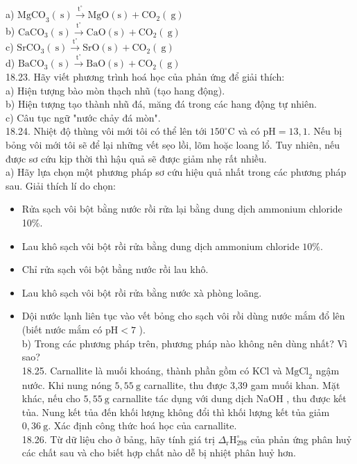 \documentclass[10pt]{article}
\begin{document}
a) $\mathrm{MgCO}_{3}(\mathrm{~s}) \xrightarrow{\mathrm{t}^{\circ}} \mathrm{MgO}(\mathrm{s})+\mathrm{CO}_{2}(\mathrm{~g})$\\
b) $\mathrm{CaCO}_{3}(\mathrm{~s}) \xrightarrow{\mathrm{t}^{\circ}} \mathrm{CaO}(\mathrm{s})+\mathrm{CO}_{2}(\mathrm{~g})$\\
c) $\mathrm{SrCO}_{3}(\mathrm{~s}) \xrightarrow{\mathrm{t}^{\circ}} \mathrm{SrO}(\mathrm{s})+\mathrm{CO}_{2}(\mathrm{~g})$\\
d) $\mathrm{BaCO}_{3}(\mathrm{~s}) \xrightarrow{\mathrm{t}^{\circ}} \mathrm{BaO}(\mathrm{s})+\mathrm{CO}_{2}(\mathrm{~g})$\\
18.23. Hãy viết phương trình hoá học của phản ứng để giải thích:\\
a) Hiện tượng bào mòn thạch nhũ (tạo hang động).\\
b) Hiện tượng tạo thành nhũ đá, măng đá trong các hang động tự nhiên.\\
c) Câu tục ngữ "nước chảy đá mòn".\\
18.24. Nhiệt độ thùng vôi mới tôi có thể lên tới $150^{\circ} \mathrm{C}$ và có $\mathrm{pH}=13,1$. Nếu bị bỏng vôi mới tôi sẽ để lại những vết sẹo lồi, lõm hoặc loang lổ. Tuy nhiên, nếu được sơ cứu kịp thời thì hậu quả sẽ được giảm nhẹ rất nhiều.\\
a) Hãy lựa chọn một phương pháp sơ cứu hiệu quả nhất trong các phương pháp sau. Giải thích lí do chọn:

\begin{itemize}
  \item Rửa sạch vôi bột bằng nước rồi rửa lại bằng dung dịch ammonium chloride 10\%.
  \item Lau khô sạch vôi bột rồi rửa bằng dung dịch ammonium chloride $10 \%$.
  \item Chỉ rửa sạch vôi bột bằng nước rồi lau khô.
  \item Lau khô sạch vôi bột rồi rửa bằng nước xà phòng loãng.
  \item Dội nước lạnh liên tục vào vết bỏng cho sạch vôi rồi dùng nước mắm đổ lên (biết nước mắm có $\mathrm{pH}<7$ ).\\
b) Trong các phương pháp trên, phương pháp nào không nên dùng nhất? Vì sao?\\
18.25. Carnallite là muối khoáng, thành phần gồm có KCl và $\mathrm{MgCl}_{2}$ ngậm nước. Khi nung nóng $5,55 \mathrm{~g}$ carnallite, thu được 3,39 gam muối khan. Mặt khác, nếu cho $5,55 \mathrm{~g}$ carnallite tác dụng với dung dịch NaOH , thu được kết tủa. Nung kết tủa đến khối lượng không đổi thì khối lượng kết tủa giảm $0,36 \mathrm{~g}$. Xác định công thức hoá học của carnallite.\\
18.26. Từ dữ liệu cho ở bảng, hãy tính giá trị $\Delta_{\mathrm{r}} \mathrm{H}_{298}^{\circ}$ của phản ứng phân huỷ các chất sau và cho biết hợp chất nào dễ bị nhiệt phân huỷ hơn.
\end{itemize}
\end{document}
